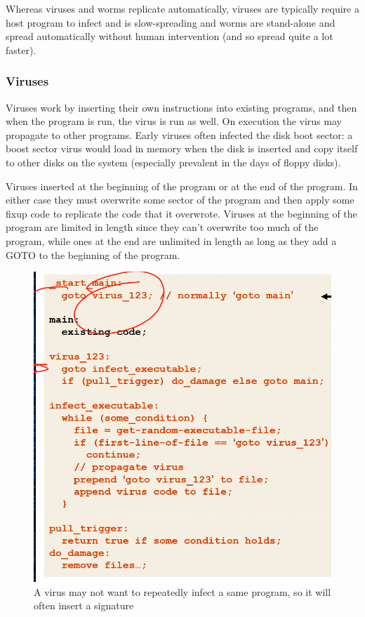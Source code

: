 \documentclass[../notes.tex]{subfiles}
\begin{document}
Whereas viruses and worms replicate automatically, viruses are typically require a host program to infect and is slow-spreading and worms are stand-alone and spread automatically without human intervention (and so spread quite a lot faster).


\subsubsection{Viruses}

Viruses work by inserting their own instructions into existing programs, and then when the program is run, the virus is run as well. On execution the virus may propagate to other programs.
Early viruses often infected the disk boot sector: a boost sector virus would load in memory when the disk is inserted and copy itself to other disks on the system (especially prevalent in the days of floppy disks).

Viruses inserted at the beginning of the program or at the end of the program. In either case they must overwrite some sector of the program and then apply some fixup code to replicate the code that it overwrote. Viruses at the beginning of the program are limited in length since they can't overwrite too much of the program, while ones at the end are unlimited in length as long as they add a GOTO to the beginning of the program.
\begin{figure}[H]
    \centering
    \includegraphics[width=0.8\linewidth]{img/image_2023-04-03-18-34-13.png}
    \caption{A virus may not want to repeatedly infect a same program, so it will often insert a signature}
\end{figure}
\end{document}
